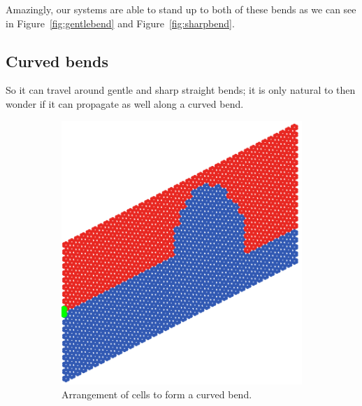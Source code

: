 Amazingly, our systems are able to stand up to both of these bends as we can see
in Figure~\ref{fig:gentlebend} and Figure~\ref{fig:sharpbend}.


\subsection{Curved bends}
So it can travel around gentle and sharp straight bends; it is only natural to
then wonder if it can propagate as well along a curved bend.

\begin{figure}
\centering
\begin{subfigure}[b]{.5\textwidth}
  \centering
  \includegraphics[width=0.8\linewidth]{imgs/curvedbendarr.png}
  \caption{Arrangement of cells to form a curved bend.}
  \label{fig:sub1}
\end{subfigure}%
\begin{subfigure}[b]{.5\textwidth}
  \centering

\end{subfigure}
\end{figure}
